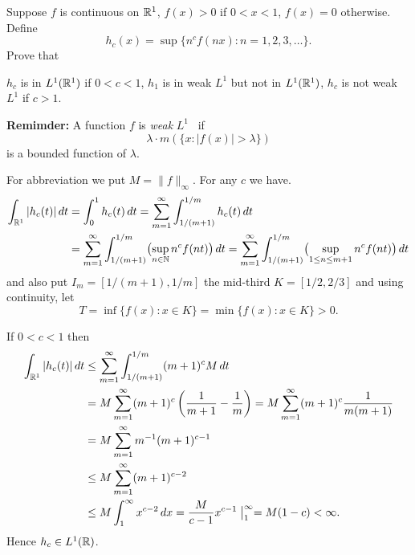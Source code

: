 \begin{enumerate}
\begin{excopy}
Suppose $f$ is continuous on \(\mathbb{R}^1\), \(f(x)>0\) if \(0 < x < 1\), \(f(x)= 0\)
otherwise. Define
\begin{equation*}
  h_c(x) = \sup \{n^c f(nx): n = 1,2,3,\ldots\}.
\end{equation*}
Prove that
\begin{itemize}
 \(h_c\) is in \(L^1(\mathbb{R}^1)\) if \(0<c<1\),
 \(h_1\) is in weak \(L^1\) but not in \(L^1(\mathbb{R}^1)\),
  \(h_c\) is not weak \(L^1\) if \(c>1\).
\end{itemize}
\end{excopy}

\textbf{Remimder:} A function $f$ is 
\emph{weak} \(L^1\)\
if 
\begin{equation*}
\lambda\cdot m\left( \{x: |f(x)| > \lambda\}\right)
\end{equation*}
is a bounded function of \(\lambda\).

For abbreviation we put \(M = \|f\|_\infty\).
For any $c$ we have.
\begin{align*}
\int_{\mathbb{R}^1} |h_c(t)|\,dt
&=    \int_0^1 h_c(t)\,dt
 =    \sum_{m=1}^\infty \int_{1/(m+1)}^{1/m} h_c(t)\,dt \\
&=    \sum_{m=1}^\infty \int_{1/(m+1)}^{1/m} 
      \bigl(\sup_{n\in\mathbb{N}} n^c f(nt)\bigr)\,dt 
 =    \sum_{m=1}^\infty \int_{1/(m+1)}^{1/m} 
      \bigl(\sup_{1\leq n\leq m+1} n^c f(nt)\bigr)\,dt
\end{align*}
and also put \(I_m=[1/(m+1),1/m]\)
the mid-third \(K= [1/2,2/3]\) and using continuity, let 
\begin{equation*}
T = \inf\{f(x): x\in K\} = \min\{f(x): x\in K\} > 0.
\end{equation*}

\begin{itemize} 
If \(0<c<1\) then
\begin{align*}
\int_{\mathbb{R}^1} |h_c(t)|\,dt
&\leq \sum_{m=1}^\infty \int_{1/(m+1)}^{1/m} (m+1)^c M\,dt \\
&=    M \sum_{m=1}^\infty (m+1)^c \left(\frac{1}{m+1} - \frac{1}{m}\right) 
 =    M \sum_{m=1}^\infty (m+1)^c \frac{1}{m(m+1)} \\
&=    M \sum_{m=1}^\infty m^{-1}(m+1)^{c-1} \\
&\leq M \sum_{m=1}^\infty (m+1)^{c-2} \\
&\leq M \int_1^\infty x^{c-2}\,dx 
=     \frac{M}{c-1}x^{c-1}\bigm|_1^\infty = M(1-c) < \infty.
\end{align*}
Hence \(h_c\in L^1(\mathbb{R})\).


\end{itemize}
\end{enumerate}
